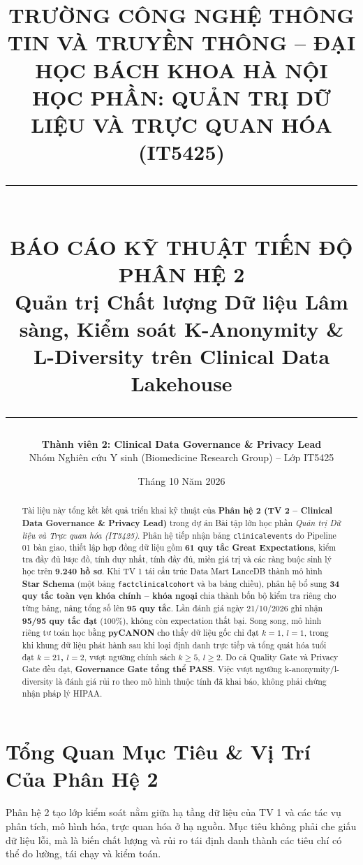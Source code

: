 \documentclass[11pt,a4paper]{article}
\title{%
  \vspace{-1.5cm}
  {\Large\bfseries TRƯỜNG CÔNG NGHỆ THÔNG TIN VÀ TRUYỀN THÔNG -- ĐẠI HỌC BÁCH KHOA HÀ NỘI}\\[0.3cm]
  {\large HỌC PHẦN: QUẢN TRỊ DỮ LIỆU VÀ TRỰC QUAN HÓA (IT5425)}\\[0.6cm]
  \rule{\textwidth}{1.5pt}\\[0.3cm]
  {\LARGE\bfseries BÁO CÁO KỸ THUẬT TIẾN ĐỘ PHÂN HỆ 2}\\[0.2cm]
  {\large\color{biomedblue}\textbf{Quản trị Chất lượng Dữ liệu Lâm sàng, Kiểm soát K-Anonymity \& L-Diversity trên Clinical Data Lakehouse}}\\[0.2cm]
  \rule{\textwidth}{0.8pt}
}
\author{%
  \textbf{Thành viên 2: Clinical Data Governance \& Privacy Lead}\\[0.1cm]
  Nhóm Nghiên cứu Y sinh (Biomedicine Research Group) -- Lớp IT5425
}
\date{Tháng 10 Năm 2026}
\renewcommand{\_}{\texorpdfstring{\origunderscore\allowbreak}{\origunderscore}}
\begin{document}
\maketitle
\thispagestyle{fancy}

\begin{abstract}
Tài liệu này tổng kết kết quả triển khai kỹ thuật của \textbf{Phân hệ 2 (TV 2 -- Clinical Data Governance \& Privacy Lead)} trong dự án Bài tập lớn học phần \textit{Quản trị Dữ liệu và Trực quan hóa (IT5425)}. Phân hệ tiếp nhận bảng \texttt{clinical\_events} do Pipeline 01 bàn giao, thiết lập hợp đồng dữ liệu gồm \textbf{61 quy tắc Great Expectations}, kiểm tra đầy đủ lược đồ, tính duy nhất, tính đầy đủ, miền giá trị và các ràng buộc sinh lý học trên \textbf{9.240 hồ sơ}. Khi TV 1 tái cấu trúc Data Mart LanceDB thành mô hình \textbf{Star Schema} (một bảng \texttt{fact\_clinical\_cohort} và ba bảng chiều), phân hệ bổ sung \textbf{34 quy tắc toàn vẹn khóa chính -- khóa ngoại} chia thành bốn bộ kiểm tra riêng cho từng bảng, nâng tổng số lên \textbf{95 quy tắc}. Lần đánh giá ngày 21/10/2026 ghi nhận \textbf{95/95 quy tắc đạt} ($100\%$), không còn expectation thất bại. Song song, mô hình riêng tư toán học bằng \textbf{pyCANON} cho thấy dữ liệu gốc chỉ đạt $k=1$, $l=1$, trong khi khung dữ liệu phát hành sau khi loại định danh trực tiếp và tổng quát hóa tuổi đạt \textbf{$k=21$, $l=2$}, vượt ngưỡng chính sách $k\geq5$, $l\geq2$. Do cả Quality Gate và Privacy Gate đều đạt, \textbf{Governance Gate tổng thể PASS}. Việc vượt ngưỡng k-anonymity/l-diversity là đánh giá rủi ro theo mô hình thuộc tính đã khai báo, không phải chứng nhận pháp lý HIPAA.
\end{abstract}

\vspace{0.3cm}
\tableofcontents
\vspace{0.5cm}

\section{Tổng Quan Mục Tiêu \& Vị Trí Của Phân Hệ 2}

Phân hệ 2 tạo lớp kiểm soát nằm giữa hạ tầng dữ liệu của TV 1 và các tác vụ phân tích, mô hình hóa, trực quan hóa ở hạ nguồn. Mục tiêu không phải che giấu dữ liệu lỗi, mà là biến chất lượng và rủi ro tái định danh thành các tiêu chí có thể đo lường, tái chạy và kiểm toán.
\end{document}
